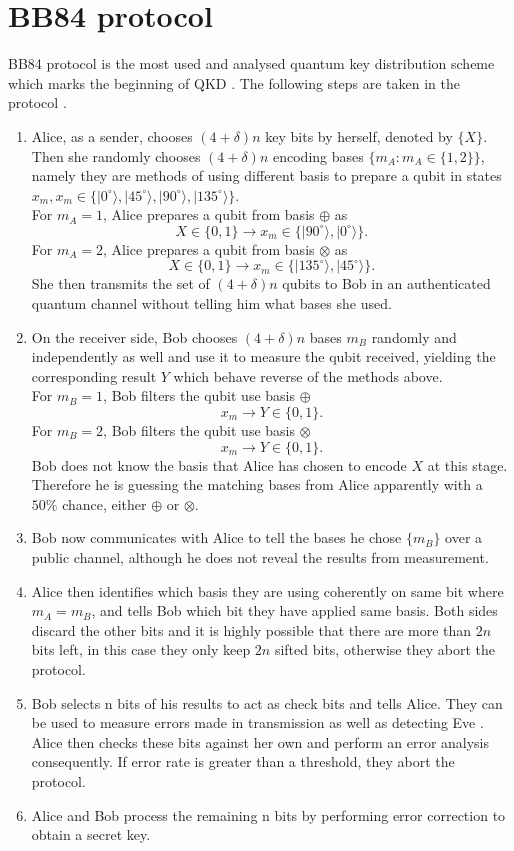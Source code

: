 \documentclass[12pt]{article}
\begin{document}
\section{BB84 protocol}
\label{BB84}
BB84 protocol is the most used and analysed quantum key distribution scheme which marks the beginning of QKD \cite[p.159]{fox2006quantum}.  The following steps are taken in the protocol \cite[p.588]{nielsen2000quantum}. 
\begin{enumerate} 
\item Alice, as a sender, chooses $(4+\delta)n$ key bits by herself, denoted by $\{X\}$. Then she randomly chooses $(4+\delta)n$ encoding bases $\{m_A:m_A\in\{1,2\}\}$, namely they are methods of using different basis to prepare a qubit in states $x_m, x_m\in\{|0^\circ\rangle,|45^\circ\rangle,|90^\circ\rangle,|135^\circ\rangle\}$.\\
For $m_A=1$, Alice prepares a qubit from basis $\oplus$ as 
\[
	X\in\{0,1\}\rightarrow x_m\in\{|90^\circ\rangle,|0^\circ\rangle\}.
\]
For $m_A=2$, Alice prepares a qubit from basis $\otimes$ as
\[
	X\in\{0,1\}\rightarrow x_m\in\{|135^\circ\rangle,|45^\circ\rangle\}.
\]
She then transmits the set of $(4+\delta)n$ qubits to Bob in an authenticated quantum channel without telling him what bases she used.
\item On the receiver side, Bob chooses $(4+\delta)n$ bases $m_B$ randomly and independently as well and use it to measure the qubit received, yielding the corresponding result $Y$ which behave reverse of the methods above.\\
For $m_B=1$, Bob filters the qubit use basis $\oplus$
\[
	x_m\rightarrow Y\in\{0,1\}.
\]
For $m_B=2$, Bob filters the qubit use basis $\otimes$
\[
	x_m\rightarrow Y\in\{0,1\}.
\] \label{measurepage}
Bob does not know the basis that Alice has chosen to encode $X$ at this stage. Therefore he is guessing the matching bases from Alice apparently with a $50\%$ chance, either $\oplus$ or $\otimes$.
\item Bob now communicates with Alice to tell the bases he chose $\{m_B\}$ over a public channel, although he does not reveal the results from measurement.
\item Alice then identifies which basis they are using coherently on same bit where $m_A=m_B$, and tells Bob which bit they have applied same basis. Both sides discard the other bits and it is highly possible that there are more than $2n$ bits left, in this case they only keep $2n$ sifted bits, otherwise they abort the protocol.
\item Bob selects n bits of his results to act as check bits and tells Alice. They can be used to measure errors made in transmission as well as detecting Eve \cite[p.26]{van2006quantum}. Alice then checks these bits against her own and perform an error analysis consequently. If error rate is greater than a threshold, they abort the protocol.
\item Alice and Bob process the remaining n bits by performing error correction to obtain a secret key.
\end{enumerate}
\end{document}

